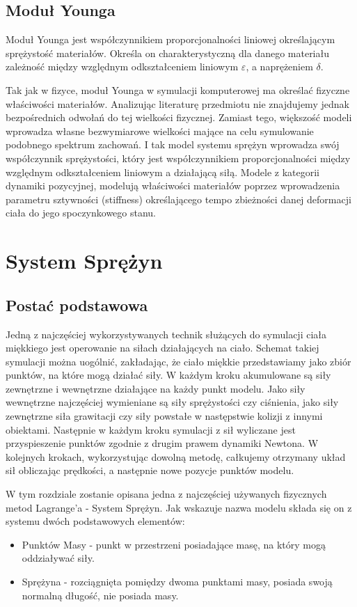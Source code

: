 \subsection{Moduł Younga}
Moduł Younga jest współczynnikiem proporcjonalności liniowej określającym
sprężystość materiałów. Określa on charakterystyczną dla danego materiału
zależność między względnym odkształceniem liniowym $\varepsilon$, a
naprężeniem $\delta$.

Tak jak w fizyce, moduł Younga w symulacji komputerowej ma określać fizyczne
właściwości materiałów. Analizując literaturę przedmiotu nie znajdujemy jednak 
bezpośrednich odwołań do tej wielkości fizycznej. Zamiast tego, większość modeli wprowadza
własne bezwymiarowe wielkości mające na celu symulowanie podobnego spektrum
zachowań. I tak model systemu sprężyn wprowadza swój współczynnik
sprężystości, który jest współczynnikiem proporcjonalności między względnym
odkształceniem liniowym a działającą siłą. Modele z kategorii dynamiki
pozycyjnej, modelują właściwości materiałów poprzez wprowadzenia parametru
sztywności (stiffness) określającego tempo zbieżności danej deformacji ciała do jego
spoczynkowego stanu.

\section{System Sprężyn}

\subsection{Postać podstawowa}

Jedną z najczęściej wykorzystywanych technik służących do symulacji ciała
miękkiego jest operowanie na siłach działających na ciało. Schemat takiej
symulacji można uogólnić, zakładając, że ciało miękkie przedstawiamy jako zbiór
punktów, na które mogą działać siły. W każdym kroku akumulowane są siły
zewnętrzne i wewnętrzne działające na każdy punkt modelu. Jako siły wewnętrzne
najczęściej wymieniane są siły sprężystości czy ciśnienia, jako siły zewnętrzne
siła grawitacji czy siły powstałe w następstwie kolizji z innymi obiektami.
Następnie w każdym kroku symulacji z sił wyliczane jest przyspieszenie punktów
zgodnie z drugim prawem dynamiki Newtona. W kolejnych krokach, wykorzystując
dowolną metodę, całkujemy otrzymany układ sił obliczając prędkości, a następnie
nowe pozycje punktów modelu.\cite{pbdyn}

W tym rozdziale zostanie opisana jedna z najczęściej używanych
fizycznych metod Lagrange'a - System Sprężyn. Jak wskazuje nazwa modelu składa
się on z systemu dwóch podstawowych elementów:
\begin{itemize}
\item Punktów Masy - punkt w przestrzeni posiadające masę, na który mogą oddziaływać siły.
\item Sprężyna - rozciągnięta pomiędzy dwoma punktami masy, posiada swoją normalną długość, nie posiada masy.

\end{itemize} 

